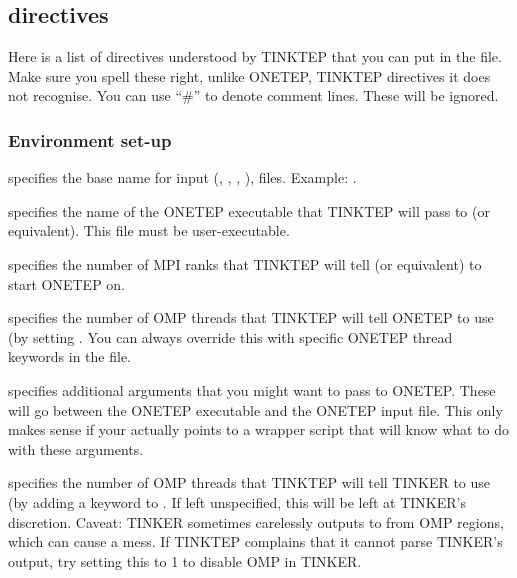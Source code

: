 \documentclass[letterpaper,10pt,english]{sphinxmanual}
\begin{document}
\subsection{ directives}
\label{\detokenize{tinktep:tinktep-config-directives}}
Here is a list of directives understood by TINKTEP that you can put in
the  file. Make sure you spell these right, unlike
ONETEP, TINKTEP  directives it does not recognise.
You can use “\#” to denote comment lines. These will be ignored.


\subsubsection{Environment set-up}
\label{\detokenize{tinktep:environment-set-up}}
  \textendash{} specifies the base name
for input (, , , ), files.
Example: .

  \textendash{} specifies the
name of the ONETEP executable that TINKTEP will pass to  (or
equivalent). This file must be user-executable.

  \textendash{} specifies the
number of MPI ranks that TINKTEP will tell  (or equivalent) to
start ONETEP on.

  \textendash{} specifies the
number of OMP threads that TINKTEP will tell ONETEP to use (by setting
. You can always override this with specific ONETEP
thread keywords in the  file.

  \textendash{} specifies additional
arguments that you might want to pass to ONETEP. These will go between
the ONETEP executable and the ONETEP input file. This only makes sense
if your  actually points to a wrapper script that
will know what to do with these arguments.

  \textendash{} specifies
the number of OMP threads that TINKTEP will tell TINKER to use (by
adding a keyword to . If left unspecified, this will be
left at TINKER’s discretion. Caveat: TINKER sometimes carelessly
outputs to  from OMP regions, which can cause a mess. If
TINKTEP complains that it cannot parse TINKER’s output, try setting
this to 1 to disable OMP in TINKER.
\end{document}

